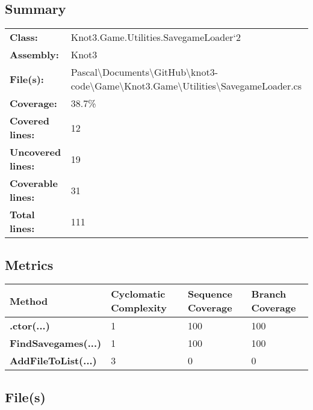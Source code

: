 \documentclass[a4paper,10pt]{article}
\begin{document}
\subsection{Summary}
\begin{longtable}[l]{ll}
\textbf{Class:} & Knot3.Game.Utilities.SavegameLoader`2\\
\textbf{Assembly:} & Knot3\\
\textbf{File(s):} & \begin{minipage}[t]{12cm}{Pascal\textbackslash Documents\textbackslash GitHub\textbackslash knot3-code\textbackslash Game\textbackslash Knot3.Game\textbackslash Utilities\textbackslash SavegameLoader.cs}\end{minipage} \\
\textbf{Coverage:} & 38.7\%\\
\textbf{Covered lines:} & 12\\
\textbf{Uncovered lines:} & 19\\
\textbf{Coverable lines:} & 31\\
\textbf{Total lines:} & 111\\
\end{longtable}
\subsection{Metrics}
\begin{longtable}[l]{|l|l|l|l|}
\hline
\textbf{Method} & \textbf{Cyclomatic Complexity} & \textbf{Sequence Coverage} & \textbf{Branch Coverage}\\
\hline
\textbf{.ctor(...)} & 1 & 100 & 100\\
\hline
\textbf{FindSavegames(...)} & 1 & 100 & 100\\
\hline
\textbf{AddFileToList(...)} & 3 & 0 & 0\\
\hline
\end{longtable}
\subsection{File(s)}
\end{document}
